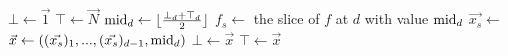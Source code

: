 \begin{algorithm}[h]
  \caption{\citep{dangQiYe}}\label{dQiYiAlg}
  \begin{algorithmic}[1]
    \State $\bot \gets \vec{1}$
    \State $\top \gets \vec{N}$
    \State \Return {}
  \EndProcedure
    \State $\text{mid}_d \gets \lfloor \frac{\bot_d + \top_d}{2} \rfloor$
    \State $f_s \gets$ the slice of $f$ at $d$ with value $\text{mid}_d$
    \State $\vec{x_s} \gets$ 
    \State $\vec{x} \gets ((\vec{x_s})_1, ..., (\vec{x_s})_{d-1}, \text{mid}_d)$
      \State {}
    \EndIf
      \State $\bot \gets \vec{x}$
    \EndIf
      \State $\top \gets \vec{x}$
    \EndIf
  \EndWhile
  \EndProcedure
  \end{algorithmic}
\end{algorithm}


